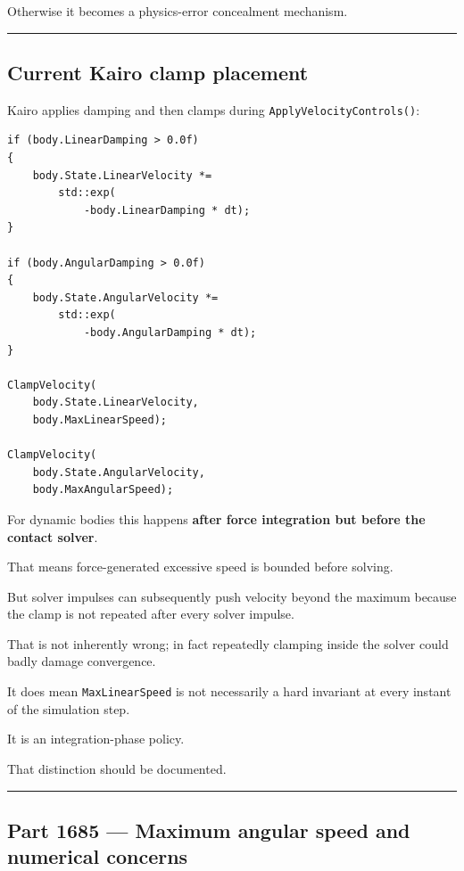 Otherwise it becomes a physics-error concealment mechanism.

\begin{center}\rule{0.5\linewidth}{0.5pt}\end{center}

\subsection{Current Kairo clamp placement}\label{06-engine-ii-ch038-current-kairo-clamp-placement}

Kairo applies damping and then clamps during \texttt{ApplyVelocityControls()}:

\begin{verbatim}
if (body.LinearDamping > 0.0f)
{
    body.State.LinearVelocity *=
        std::exp(
            -body.LinearDamping * dt);
}

if (body.AngularDamping > 0.0f)
{
    body.State.AngularVelocity *=
        std::exp(
            -body.AngularDamping * dt);
}

ClampVelocity(
    body.State.LinearVelocity,
    body.MaxLinearSpeed);

ClampVelocity(
    body.State.AngularVelocity,
    body.MaxAngularSpeed);
\end{verbatim}

For dynamic bodies this happens \textbf{after force integration but before the contact solver}.

That means force-generated excessive speed is bounded before solving.

But solver impulses can subsequently push velocity beyond the maximum because the clamp is not repeated after every solver impulse.

That is not inherently wrong; in fact repeatedly clamping inside the solver could badly damage convergence.

It does mean \texttt{MaxLinearSpeed} is not necessarily a hard invariant at every instant of the simulation step.

It is an integration-phase policy.

That distinction should be documented.

\begin{center}\rule{0.5\linewidth}{0.5pt}\end{center}

\subsection{Part 1685 --- Maximum angular speed and numerical concerns}\label{06-engine-ii-ch038-part-1685-maximum-angular-speed-and-numerical-concerns}

